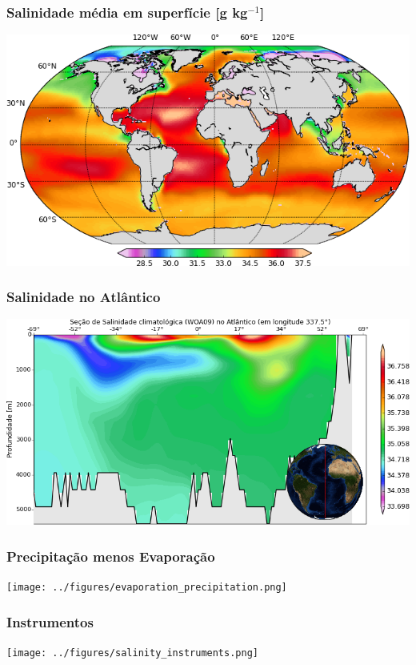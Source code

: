 \begin{frame}
\frametitle{Salinidade média em superfície [g kg$^{-1}$]}
    \begin{center}
        \includegraphics[scale=0.5]{./figures/surface_salinity_woa09.png}
    \end{center}
\end{frame}

\begin{frame}
\frametitle{Salinidade no Atlântico}
    \begin{center}
        \includegraphics[scale=0.4]{./figures/cross_section_salinity_woa09.png}
    \end{center}
\end{frame}

\begin{frame}
\frametitle{Precipitação menos Evaporação}
    \begin{center}
        \texttt{[image: ../figures/evaporation\_precipitation.png]}
    \end{center}
\end{frame}

\begin{frame}
\frametitle{Instrumentos}
    \begin{center}
        \texttt{[image: ../figures/salinity\_instruments.png]}
    \end{center}
\end{frame}

